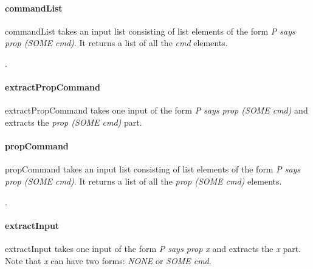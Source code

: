 \documentclass[../../main/main.tex]{subfiles}
\begin{document}
\HOLssmTheoremsextractCommandXXdef


\paragraph*{commandList}
commandList takes an input list consisting of list elements of the form \textit{P says prop (SOME cmd)}.  It returns a list of all the \textit{cmd} elements.
\begin{tabbing}
\parskip=8pt
\HOLTokenTurnstile{} \HOLSymConst{\HOLTokenForall{}}. \\
\hspace{0.3cm}   \HOLSymConst{=}   
\parskip=18pt
\end{tabbing}

\paragraph*{extractPropCommand}
extractPropCommand takes one input of the form \textit{P says prop (SOME cmd)} and extracts the \textit{prop (SOME cmd)} part.

\HOLssmTheoremsextractPropCommandXXdef


\paragraph*{propCommand}
propCommand takes an input list consisting of list elements of the form \textit{P says prop (SOME cmd)}.  It returns a list of all the \textit{prop (SOME cmd)} elements.
\begin{tabbing}
\parskip=8pt
\HOLTokenTurnstile{} \HOLSymConst{\HOLTokenForall{}}. \\
\hspace{0.3cm}   \HOLSymConst{=}   
\parskip=18pt
\end{tabbing}


\paragraph*{extractInput}
extractInput takes one input of the form \textit{P says prop x} and extracts the \textit{x} part. Note that \textit{x} can have two forms: \textit{NONE} or \textit{SOME cmd}.
\end{document}
